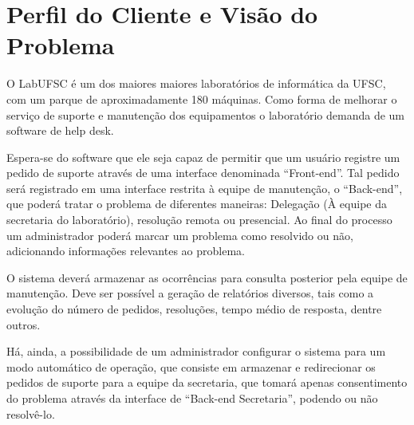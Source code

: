 \documentclass[brazil]{abnt}
\begin{document}






\capa

\folhaderosto

\tableofcontents

\chapter{Perfil do Cliente e Visão do Problema}
O LabUFSC é um dos maiores maiores laboratórios de informática da UFSC, com um
parque de aproximadamente 180 máquinas. Como forma de melhorar o serviço de 
suporte e manutenção dos equipamentos o laboratório demanda de um software de
help desk.

Espera-se do software que ele seja capaz de permitir que um usuário registre um
pedido de suporte através de uma interface denominada “Front-end”. Tal pedido
será registrado em uma interface restrita à equipe de manutenção, o “Back-end”,
que poderá tratar o problema de diferentes maneiras: Delegação (À equipe da
secretaria do laboratório), resolução remota ou presencial. Ao final do
processo um administrador poderá marcar um problema como resolvido ou não,
adicionando informações relevantes ao problema.

O sistema deverá armazenar as ocorrências para consulta posterior pela equipe
de manutenção. Deve ser possível a geração de relatórios diversos, tais como a
evolução do número de pedidos, resoluções, tempo médio de resposta, dentre
outros.

Há, ainda, a possibilidade de um administrador configurar o sistema para um
modo automático de operação, que consiste em armazenar e redirecionar os
pedidos de suporte para a equipe da secretaria, que tomará apenas consentimento
do problema através da interface de “Back-end Secretaria”, podendo ou não resolvê-lo.
\end{document}
